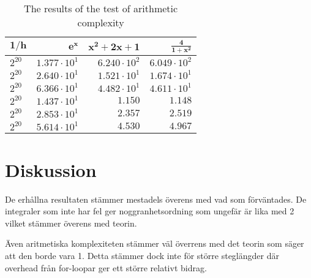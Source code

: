 \documentclass[a4paper,titlepage]{article}
\begin{document}
\begin{table}[h]
    \centering
    \begin{tabular}{l | r | r | r}
        $\mathbf{1/h}$ & $\mathbf{e^x}$         & $\mathbf{x^2 + 2x + 1}$ &  $\mathbf{\frac{4}{1 + x^2}}$ & \\ \hline
        $2^{20}$       & $ 1.377 \cdot 10^{1} $ & $ 6.240 \cdot 10^{2} $  & $ 6.049 \cdot 10^{2}          $ \\
        $2^{20}$       & $ 2.640 \cdot 10^{1} $ & $ 1.521 \cdot 10^{1} $  & $ 1.674 \cdot 10^{1}          $ \\
        $2^{20}$       & $ 6.366 \cdot 10^{1} $ & $ 4.482 \cdot 10^{1} $  & $ 4.611 \cdot 10^{1}          $ \\
        $2^{20}$       & $ 1.437 \cdot 10^{1} $ & $ 1.150              $  & $ 1.148                       $ \\
        $2^{20}$       & $ 2.853 \cdot 10^{1} $ & $ 2.357              $  & $ 2.519                       $ \\
        $2^{20}$       & $ 5.614 \cdot 10^{1} $ & $ 4.530              $  & $ 4.967                       $ \\

    \end{tabular}
    \caption{The results of the test of arithmetic complexity}
\end{table}


\section{Diskussion}

De erhållna resultaten stämmer mestadels överens med vad som förväntades. De integraler
som inte har fel ger noggranhetsordning som ungefär är lika med 2 vilket stämmer överens
med teorin.

Även aritmetiska komplexiteten stämmer väl överrens med det teorin som säger att
den borde vara 1. Detta stämmer dock inte för större steglängder där overhead från
for-loopar ger ett större relativt bidrag.
\end{document}
